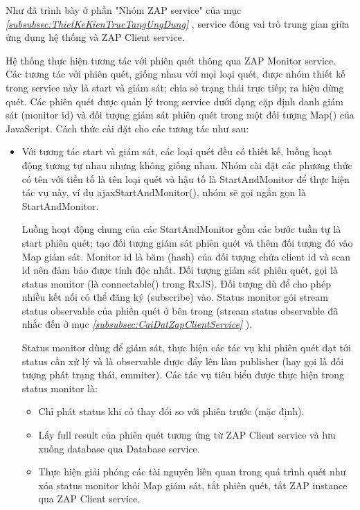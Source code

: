 \tab Như đã trình bày ở phần "Nhóm ZAP service" của mục \textit{\ref{subsubsec:ThietKeKienTrucTangUngDung} }, service đóng vai trò trung gian giữa ứng dụng hệ thống và ZAP Client service.

Hệ thống thực hiện tương tác với phiên quét thông qua ZAP Monitor service.
Các tương tác với phiên quét, giống nhau với mọi loại quét, được nhóm thiết kế trong service này là start và giám sát; chia sẻ trạng thái trực tiếp; ra hiệu dừng quét.
Các phiên quét được quản lý trong service dưới dạng cặp định danh giám sát (monitor id) và đối tượng giám sát phiên quét trong một đối tượng Map() của JavaScript.
Cách thức cài đặt cho các tương tác như sau:

\begin{itemize}
  \item Với tương tác start và giám sát, các loại quét đều có thiết kế, luồng hoạt động tương tự nhau nhưng không giống nhau.
        Nhóm cài đặt các phương thức có tên với tiền tố là tên loại quét và hậu tố là StartAndMonitor để thực hiện tác vụ này, ví dụ ajaxStartAndMonitor(), nhóm sẽ gọi ngắn gọn là StartAndMonitor.

        Luồng hoạt động chung của các StartAndMonitor gồm các bước tuần tự là start phiên quét; tạo đối tượng giám sát phiên quét và thêm đối tượng đó vào Map giám sát.
        Monitor id là băm (hash) của đối tượng chứa client id và scan id nên đảm bảo được tính độc nhất.
        Đối tượng giám sát phiên quét, gọi là status monitor (là connectable() trong RxJS).
        Đối tượng dù để cho phép nhiều kết nối có thể đăng ký (subscribe) vào.
        Status monitor gói stream status observable của phiên quét ở bên trong (stream status observable đã nhắc đến ở mục \textit{\ref{subsubsec:CaiDatZapClientService} }).

        Status monitor dùng để giám sát, thực hiện các tác vụ khi phiên quét đạt tới status cần xử lý và là observable được đẩy lên làm publisher (hay gọi là đối tượng phát trạng thái, emmiter).
        Các tác vụ tiêu biểu được thực hiện trong status monitor là:
        \begin{itemize}
          \item Chỉ phát status khi có thay đổi so với phiên trước (mặc định).
          \item Lấy full result của phiên quét tương ứng từ ZAP Client service và lưu xuống database qua Database service.
          \item Thực hiện giải phóng các tài nguyên liên quan trong quá trình quét như xóa status monitor khỏi Map giám sát, tắt phiên quét, tắt ZAP instance qua ZAP Client service.
        \end{itemize}


\end{itemize}
